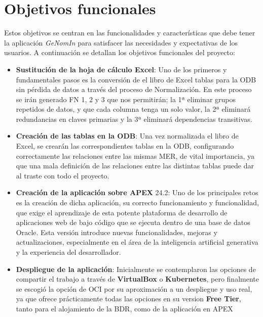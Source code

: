 
\section{Objetivos funcionales}

Estos objetivos se centran en las funcionalidades y características que debe tener la aplicación \textit{GeNomIn} para satisfacer las necesidades y expectativas de los usuarios. A continuación se detallan los objetivos funcionales del proyecto:

\begin{itemize}
	\item \textbf{Sustitución de la hoja de cálculo Excel}: Uno de los primeros y fundamentales pasos es la conversión de el libro de Excel tablas para la \acrfull{ODB} sin pérdida de datos a través del proceso de \gls{Normalización}.
	En este proceso se irán generado \acrfull{FN} 1, 2 y 3 que nos permitirán; la 1ª eliminar grupos repetidos de datos, y que cada columna tenga un solo valor, la 2ª eliminará redundancias en claves primarias y la 3ª eliminará dependencias transitivas.
	\item \textbf{Creación de las tablas en la \acrfull{ODB}}: Una vez normalizada el libro de Excel, se crearán las correspondientes tablas en la \acrshort{ODB}, configurando correctamente las relaciones entre las mismas \gls{MER}, de vital importancia, ya que una mala definición de las relaciones entre las distintas tablas puede dar al traste con todo el proyecto.
	\item \textbf{Creación de la aplicación sobre \acrfull{APEX}} 24.2: Uno de los principales retos es la creación de dicha aplicación, su correcto funcionamiento y  funcionalidad, que exige el aprendizaje de esta potente  plataforma de desarrollo de aplicaciones web de bajo código que se ejecuta dentro de una base de datos Oracle. Esta versión introduce nuevas funcionalidades, mejoras y actualizaciones, especialmente en el área de la inteligencia artificial generativa y la experiencia del desarrollador.
	\item \textbf{Despliegue de la aplicación}: Inicialmente se contemplaron las opciones de compartir el trabajo a través de \textbf{VirtualBox} o \textbf{Kubernetes}, pero finalmente se escogió la opción de \acrfull{OCI} por su aproximación a un despliegue y uso real, ya que ofrece prácticamente todas las opciones en su version \textbf{Free Tier}, tanto para el alojamiento de la \acrshort{BDR}, como de la aplicación en \acrfull{APEX}
		
\end{itemize}

